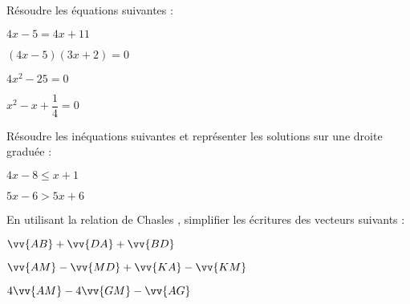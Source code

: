 \documentclass[a4paper,addpoints,12pt]{exam}
\begin{document}
\devoir[prv=false,ds=true,num=4 ,niv=3,sem=2 ,date=02/03/2023]

\begin{exo}[6]
\begin{questions}
\question Résoudre les équations suivantes :
\begin{multicols}{4}
$4x-5=4x+11$ \newline
\anserline[4]
\columnbreak

$(4x-5)(3x+2)=0$\newline
\anserline[4]
\columnbreak

$4x^{2}-25=0$\newline
\anserline[4]
\columnbreak

$x^{2}-x+\dfrac{1}{4}=0$\newline
\anserline[4]
\end{multicols}
\question Résoudre les inéquations suivantes et représenter les solutions sur une droite graduée :
\begin{multicols}{2}
$4x-8\leq x+1$ \newline
\anserline[4]
\columnbreak

$5x-6 > 5x+6$\newline
\anserline[4]
\end{multicols}
\end{questions}
\end{exo}

\begin{exo}[6]
\begin{questions}
\question En utilisant la relation de Chasles , simplifier les écritures des vecteurs suivants :
\begin{multicols}{3}
\(
\vv{AB}+\vv{DA}+\vv{BD}\)\newline
\anserline[4]
\columnbreak

\( \vv{AM}-\vv{MD}+\vv{KA}-\vv{KM}\)\newline
\anserline[4]
\columnbreak

\( 4\vv{AM}-4\vv{GM}-\vv{AG}\)\newline
\anserline[4]
\end{multicols}

\end{questions}
\end{exo}
\end{document}
